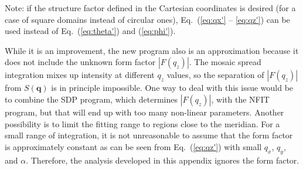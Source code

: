 Note: if the structure factor defined in the Cartesian coordinates is desired
(for a case of square domains instead of circular ones),
Eq.~(\ref{eq:qx'} -- \ref{eq:qz'}) can be used instead of 
Eq.~(\ref{eq:theta'}) and (\ref{eq:phi'}).

While it is an improvement, the new program also is an approximation because 
it does not include the unknown form factor $|F(q_z)|$. 
The mosaic spread integration mixes up intensity at different $q_z$ values, so
the separation of $|F(q_z)|$ from $S(\mathbf{q})$ is in principle impossible. 
One way to deal with this issue would be to combine the SDP program, 
which determines $|F(q_z)|$, with the NFIT program, but
that will end up with too many non-linear parameters.
Another possibility is to limit the fitting range to regions close to the meridian.
For a small range of integration, it is not unreasonable to assume that
the form factor is approximately constant as can be seen from 
Eq.~(\ref{eq:qz'}) with small $q_x$, $q_y$, and $\alpha$. 
Therefore, the analysis developed in this appendix ignores the form factor.

\newpage
